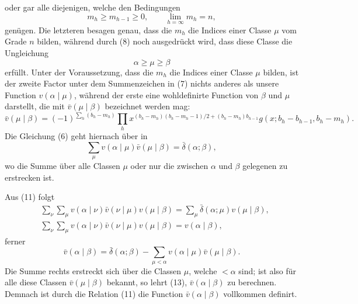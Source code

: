 oder gar alle diejenigen, welche den Bedingungen
\begin{equation}
 m_h\ge m_{h-1}\ge0,
 \qquad \lim_{h=\infty}m_h=n,
\tag{9}
\end{equation}
genügen. Die letzteren besagen genau, dass die $m_h$ die Indices einer Classe $\mu$ vom Grade $n$ bilden, während durch (8) noch ausgedrückt wird, dass diese Classe die Ungleichung
\[
 \alpha\ge\mu\ge\beta
\]
erfüllt. Unter der Voraussetzung, dass die $m_h$ die Indices einer Classe $\mu$ bilden, ist der zweite Factor unter dem Summenzeichen in (7) nichts anderes als unsere Function $v(\alpha\mid\mu)$, während der erste eine wohldefinirte Function von $\beta$ und $\mu$ darstellt, die mit $\bar v(\mu\mid\beta)$ bezeichnet werden mag:
\begin{equation}
 \bar v(\mu\mid\beta)=(-1)^{\sum_h(b_h-m_h)}
 \prod_h x^{(b_h-m_h)(b_h-m_h-1)/2+(b_h-m_h)b_{h-1}}
 g(x;b_h-b_{h-1},b_h-m_h).
\tag{10}
\end{equation}
Die Gleichung (6) geht hiernach über in
\begin{equation}
 \sum_{\mu}v(\alpha\mid\mu)\bar v(\mu\mid\beta)=\bar\delta(\alpha;\beta),
\tag{11}
\end{equation}
wo die Summe über alle Classen $\mu$ oder nur die zwischen $\alpha$ und $\beta$ gelegenen zu erstrecken ist.

Aus (11) folgt
\begin{align*}
&\sum_\nu\sum_\mu v(\alpha\mid\nu)\bar v(\nu\mid\mu)v(\mu\mid\beta)
 =\sum_\mu\bar\delta(\alpha;\mu)v(\mu\mid\beta),\\
&\sum_\nu\sum_\mu v(\alpha\mid\nu)\bar v(\nu\mid\mu)v(\mu\mid\beta)=v(\alpha\mid\beta),
\tag{12}
\end{align*}
ferner
\begin{equation}
 \bar v(\alpha\mid\beta)=\bar\delta(\alpha;\beta)
 -\sum_{\mu<\alpha}v(\alpha\mid\mu)\bar v(\mu\mid\beta).
\tag{13}
\end{equation}
Die Summe rechts erstreckt sich über die Classen $\mu$, welche $<\alpha$ sind; ist also für alle diese Classen $\bar v(\mu\mid\beta)$ bekannt, so lehrt (13), $\bar v(\alpha\mid\beta)$ zu berechnen. Demnach ist durch die Relation (11) die Function $\bar v(\alpha\mid\beta)$ vollkommen definirt.

